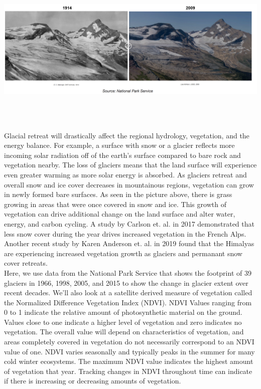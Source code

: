 \documentclass[11pt]{article}
\begin{document}
\begin{center}
\includegraphics[width=6in, height= 3in]{glacier_retreat_intro.png}
\end{center}

Glacial retreat will drastically affect the regional hydrology, vegetation, and the energy balance. For example, a surface with snow or a glacier reflects more incoming solar radiation off of the earth’s surface compared to bare rock and vegetation nearby. The loss of glaciers means that the land surface will experience even greater warming as more solar energy is absorbed. As glaciers retreat and overall snow and ice cover decreases in mountainous regions, vegetation can grow in newly formed bare surfaces. As seen in the picture above, there is grass growing in areas that were once covered in snow and ice. This growth of vegetation can drive additional change on the land surface and alter water, energy, and carbon cycling. A study by Carlson et. al. in 2017 demonstrated that less snow cover during the year drives increased vegetation in the French Alps. Another recent study by Karen Anderson et. al. in 2019 found that the Himalyas are experiencing increased vegetation growth as glaciers and permanant snow cover retreats.\\

Here, we use data from the National Park Service that shows the footprint of 39 glaciers in 1966, 1998, 2005, and 2015 to show the change in glacier extent over recent decades. We’ll also look at a satellite derived measure of vegetation called the Normalized Difference Vegetation Index (NDVI). NDVI Values ranging from 0 to 1 indicate the relative amount of photosynthetic material on the ground. Values close to one indicate a higher level of vegetation and zero indicates no vegetation. The overall value will depend on characteristics of vegetation, and areas completely covered in vegetation do not necessarily correspond to an NDVI value of one. NDVI varies seasonally and typically peaks in the summer for many cold winter ecosystems. The maximum NDVI value indicates the highest amount of vegetation that year. Tracking changes in NDVI throughout time can indicate if there is increasing or decreasing amounts of vegetation.\\
\end{document}
